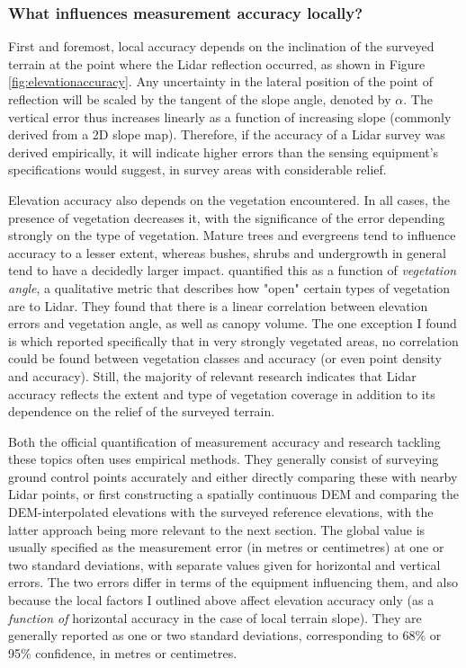 \subsubsection{What influences measurement accuracy locally?}

First and foremost, local accuracy depends on the inclination of the surveyed terrain at the point where the Lidar reflection occurred, as shown in Figure \ref{fig:elevationaccuracy}. Any uncertainty in the lateral position of the point of reflection will be scaled by the tangent of the slope angle, denoted by $\alpha$. The vertical error thus increases linearly as a function of increasing slope (commonly derived from a 2D slope map). Therefore, if the accuracy of a Lidar survey was derived empirically, it will indicate higher errors than the sensing equipment's specifications would suggest, in survey areas with considerable relief.

Elevation accuracy also depends on the vegetation encountered. In all cases, the presence of vegetation decreases it, with the significance of the error depending strongly on the type of vegetation. Mature trees and evergreens tend to influence accuracy to a lesser extent, whereas bushes, shrubs and undergrowth in general tend to have a decidedly larger impact. \cite{peng_shih_2006} quantified this as a function of \textit{vegetation angle}, a qualitative metric that describes how "open" certain types of vegetation are to Lidar. They found that there is a linear correlation between elevation errors and vegetation angle, as well as canopy volume. The one exception I found is \cite{raber_etal_2007} which reported specifically that in very strongly vegetated areas, no correlation could be found between vegetation classes and accuracy (or even point density and accuracy). Still, the majority of relevant research indicates that Lidar accuracy reflects the extent and type of vegetation coverage in addition to its dependence on the relief of the surveyed terrain.

Both the official quantification of measurement accuracy and research tackling these topics often uses empirical methods. They generally consist of surveying ground control points accurately and either directly comparing these with nearby Lidar points, or first constructing a spatially continuous DEM and comparing the DEM-interpolated elevations with the surveyed reference elevations, with the latter approach being more relevant to the next section. The global value is usually specified as the measurement error (in metres or centimetres) at one or two standard deviations, with separate values given for horizontal and vertical errors. The two errors differ in terms of the equipment influencing them, and also because the local factors I outlined above affect elevation accuracy only (as a \textit{function of} horizontal accuracy in the case of local terrain slope). They are generally reported as one or two standard deviations, corresponding to 68\% or 95\% confidence, in metres or centimetres.

